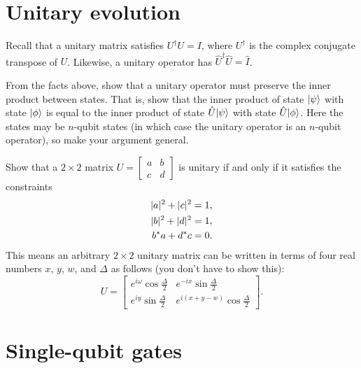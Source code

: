 \documentclass{../phys084}
\author{}
\date{2020 February 5}
\begin{document}
\section{Unitary evolution}

\begin{exercise}
  Recall that a unitary matrix satisfies \(U^\dagger U = I\), where
  \(U^\dagger\) is the complex conjugate transpose of \(U\).
  Likewise, a unitary operator has \(\hat U^\dagger \hat U = \hat I\).

  \begin{problems}
  \item From the facts above, show that a unitary operator must
    preserve the inner product between states.  That is, show that the
    inner product of state \(\lvert\psi\rangle\) with state \(\lvert\phi\rangle\) is
    equal to the inner product of state \(\hat U \lvert\psi\rangle\) with
    state \(\hat U \lvert\phi\rangle\).  Here the states may be \(n\)-qubit
    states (in which case the unitary operator is an \(n\)-qubit
    operator), so make your argument general.
  \item Show that a \(2 \times 2\) matrix
    \(U = \begin{bmatrix} a & b \\ c & d \end{bmatrix}\) is unitary if
    and only if it satisfies the constraints
    \begin{align*}
      \lvert a\rvert^2 + \lvert c\rvert^2 &= 1, \\
      \lvert b\rvert^2 + \lvert d\rvert^2 &= 1, \\
      b^*a + d^* c &= 0.
    \end{align*}
    This means an arbitrary \(2 \times 2\) unitary matrix can be
    written in terms of four real numbers \(x\), \(y\), \(w\), and
    \(\Delta\) as follows (you don't have to show this):
    \[
      U =
      \begin{bmatrix}
        e^{i\omega} \cos \frac \Delta 2 & e^{-ix} \sin \frac \Delta 2 \\
        e^{iy} \sin \frac \Delta 2 & e^{i(x+y-w)} \cos \frac \Delta 2
      \end{bmatrix}.
    \]
  \end{problems}
\end{exercise}

\begin{solution}
\end{solution}

\section{Single-qubit gates}
\end{document}
